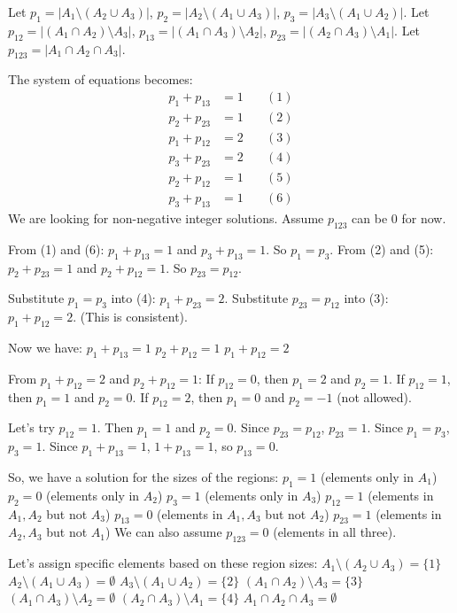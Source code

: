 \documentclass{article}
\begin{document}
\begin{itemize}
\begin{itemize}
\begin{itemize}
Let $p_1 = |A_1 \setminus (A_2 \cup A_3)|$, $p_2 = |A_2 \setminus (A_1 \cup A_3)|$, $p_3 = |A_3 \setminus (A_1 \cup A_2)|$.
Let $p_{12} = |(A_1 \cap A_2) \setminus A_3|$, $p_{13} = |(A_1 \cap A_3) \setminus A_2|$, $p_{23} = |(A_2 \cap A_3) \setminus A_1|$.
Let $p_{123} = |A_1 \cap A_2 \cap A_3|$.

The system of equations becomes:
\begin{align*} p_1 + p_{13} &= 1 \quad &(1) \\ p_2 + p_{23} &= 1 \quad &(2) \\ p_1 + p_{12} &= 2 \quad &(3) \\ p_3 + p_{23} &= 2 \quad &(4) \\ p_2 + p_{12} &= 1 \quad &(5) \\ p_3 + p_{13} &= 1 \quad &(6)\end{align*}
We are looking for non-negative integer solutions. Assume $p_{123}$ can be $0$ for now.

From (1) and (6): $p_1+p_{13}=1$ and $p_3+p_{13}=1$. So $p_1 = p_3$.
From (2) and (5): $p_2+p_{23}=1$ and $p_2+p_{12}=1$. So $p_{23} = p_{12}$.

Substitute $p_1=p_3$ into (4): $p_1 + p_{23} = 2$.
Substitute $p_{23}=p_{12}$ into (3): $p_1 + p_{12} = 2$. (This is consistent).

Now we have:
$p_1 + p_{13} = 1$
$p_2 + p_{12} = 1$
$p_1 + p_{12} = 2$

From $p_1 + p_{12} = 2$ and $p_2 + p_{12} = 1$:
If $p_{12} = 0$, then $p_1=2$ and $p_2=1$.
If $p_{12} = 1$, then $p_1=1$ and $p_2=0$.
If $p_{12} = 2$, then $p_1=0$ and $p_2=-1$ (not allowed).

Let's try $p_{12}=1$. Then $p_1=1$ and $p_2=0$.
Since $p_{23} = p_{12}$, $p_{23}=1$.
Since $p_1 = p_3$, $p_3=1$.
Since $p_1+p_{13}=1$, $1+p_{13}=1$, so $p_{13}=0$.

So, we have a solution for the sizes of the regions:
$p_1 = 1$ (elements only in $A_1$)
$p_2 = 0$ (elements only in $A_2$)
$p_3 = 1$ (elements only in $A_3$)
$p_{12} = 1$ (elements in $A_1, A_2$ but not $A_3$)
$p_{13} = 0$ (elements in $A_1, A_3$ but not $A_2$)
$p_{23} = 1$ (elements in $A_2, A_3$ but not $A_1$)
We can also assume $p_{123} = 0$ (elements in all three).

Let's assign specific elements based on these region sizes:
$A_1 \setminus (A_2 \cup A_3) = \{1\}$
$A_2 \setminus (A_1 \cup A_3) = \emptyset$
$A_3 \setminus (A_1 \cup A_2) = \{2\}$
$(A_1 \cap A_2) \setminus A_3 = \{3\}$
$(A_1 \cap A_3) \setminus A_2 = \emptyset$
$(A_2 \cap A_3) \setminus A_1 = \{4\}$
$A_1 \cap A_2 \cap A_3 = \emptyset$


\end{itemize}
\end{itemize}
\end{itemize}
\end{document}
